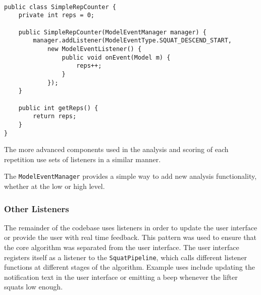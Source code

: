 \begin{lstlisting}[style=javastyle]

public class SimpleRepCounter {
	private int reps = 0;

	public SimpleRepCounter(ModelEventManager manager) {
		manager.addListener(ModelEventType.SQUAT_DESCEND_START,
			new ModelEventListener() {
				public void onEvent(Model m) {
					reps++;
				}
			});
	}

	public int getReps() {
		return reps;
	}
}

\end{lstlisting}

The more advanced components used in the analysis and scoring of each repetition use sets of listeners in a similar manner.

The \verb!ModelEventManager! provides a simple way to add new analysis functionality, whether at the low or high level.

\subsubsection{Other Listeners}

The remainder of the codebase uses listeners in order to update the user interface or provide the user with real time feedback. This pattern was used to ensure that the core algorithm was separated from the user interface. The user interface registers itself as a listener to the \verb!SquatPipeline!, which calls different listener functions at different stages of the algorithm. Example uses include updating the notification text in the user interface or emitting a beep whenever the lifter squats low enough.